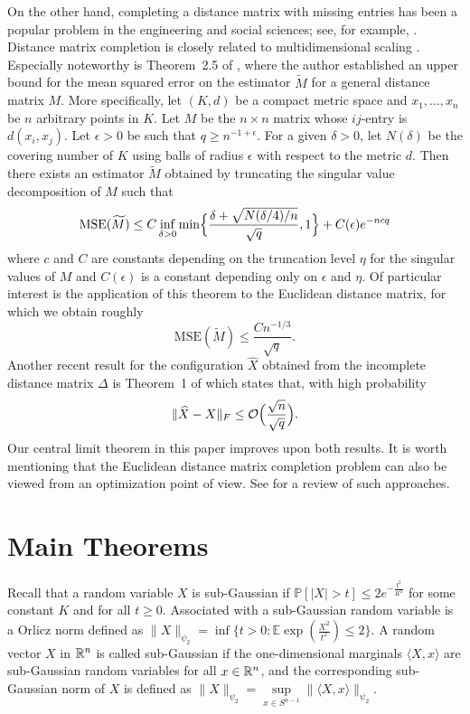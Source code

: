 On the other hand, completing a distance matrix with missing entries
has been a popular problem in the engineering and social sciences;
see, for example, \cite{Alfakih1999,Bakonyi,Singer9507, Spence1974}
. Distance matrix completion is closely related to multidimensional
scaling \citep{BGbook,Chatterjee, Javanmard2013, Montanari}. Especially
noteworthy is Theorem~2.5 of \cite{Chatterjee}, where the author
established an upper bound for the mean squared error on the estimator
$\tilde{M}$ for a general distance matrix $M$. More specifically, let
$(K,d)$ be a compact metric space and $x_1, \dots, x_n$ be $n$
arbitrary points in $K$. Let $M$ be the $n \times n$ matrix whose
$ij$-entry is $d(x_i,x_j)$. Let $\epsilon > 0$ be such that $q \geq
n^{-1 + \epsilon}$. For a given $\delta > 0$, let $N(\delta)$ be the
covering number of $K$ using balls of radius $\epsilon$ with respect
to the metric $d$. Then there exists an estimator $\tilde{M}$ obtained
by truncating the singular value decomposition of $M$ such that
$$ \mathrm{MSE}(\tilde{M}) \leq C \inf_{\delta > 0} \min \Bigl\{  \frac{\delta + \sqrt{ N(\delta/4) /n}}{\sqrt{q}} , 1 \Bigr \} + C(\epsilon) e^{-ncq}$$
where $c$ and $C$ are constants depending on the truncation level $\eta$ for 
the singular values of $M$ and $C(\epsilon)$ is a constant depending only on $\epsilon$ and $\eta$. Of particular interest is the application of this theorem to the
Euclidean distance matrix, for which we obtain roughly
$$\textrm{MSE} (\tilde{M}) \leq \frac{Cn^{-1/3}}{\sqrt{q}}.$$ 
Another recent result for the configuration $\hat{X}$ obtained from the incomplete distance matrix $\Delta$
is Theorem~1 of \cite{Taghizadeh} which states that, with high
probability
$$\|\hat{X} - X\|_F \leq \mathcal{O}\Bigl(\frac{\sqrt{n}}{\sqrt{q}}\Bigr).$$ 
Our central limit theorem in this paper improves upon both results.  It is worth mentioning that the Euclidean distance matrix completion problem can also be
viewed from an optimization point of view. See
\cite{Tasissa2018ExactRO} for a review of such approaches.


\section{Main Theorems}
\label{main}

Recall that a random variable $X$ is sub-Gaussian if $\mathbb{P}[ | X
| > t] \leq 2 e^{ -\frac{t^2}{ {K}^2} }$ for some constant $K$ and for
all $t \geq 0$.  Associated with a sub-Gaussian random variable is a
Orlicz norm defined as $ \| X \|_{\psi_2} = \inf \{ t >0 : \mathbb{E}
\exp(\frac{X^2 }{t^2}) \leq 2 \}$.  A random vector $X$ in $\R^n$ is
called sub-Gaussian if the one-dimensional marginals $\big \langle X,
x \big \rangle$ are sub-Gaussian random variables for all $x \in
\R^n$, and the corresponding sub-Gaussian norm of $X$ is defined as
$\|X\|_{\psi_2} = \sup\limits_{x \in S^{n-1}} \| \big \langle X, x
\big \rangle \|_{\psi_2}$.


